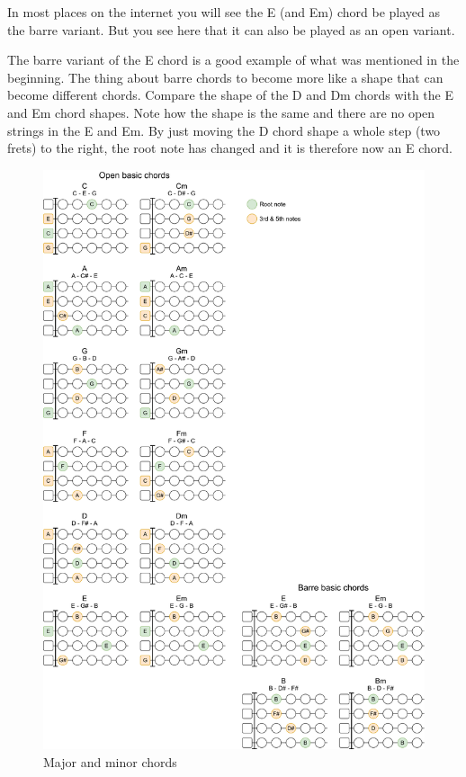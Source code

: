 In most places on the internet you will see the E (and Em) chord be played as the barre variant. But you see here that it can also be played as an open variant.

The barre variant of the E chord is a good example of what was mentioned in the beginning. The thing about barre chords to become more like a shape that can become different chords. Compare the shape of the D and Dm chords with the E and Em chord shapes. Note how the shape is the same and there are no open strings in the E and Em. By just moving the D chord shape a whole step (two frets) to the right, the root note has changed and it is therefore now an E chord.

\newpage

\begin{figure}[h]
	\centering
	\includegraphics[height=0.9\textheight]{../../Images/UkuleleBasicChords.png}
	\caption{Major and minor chords}
	\label{fig:ukulele_major_minor_chords}
\end{figure}

